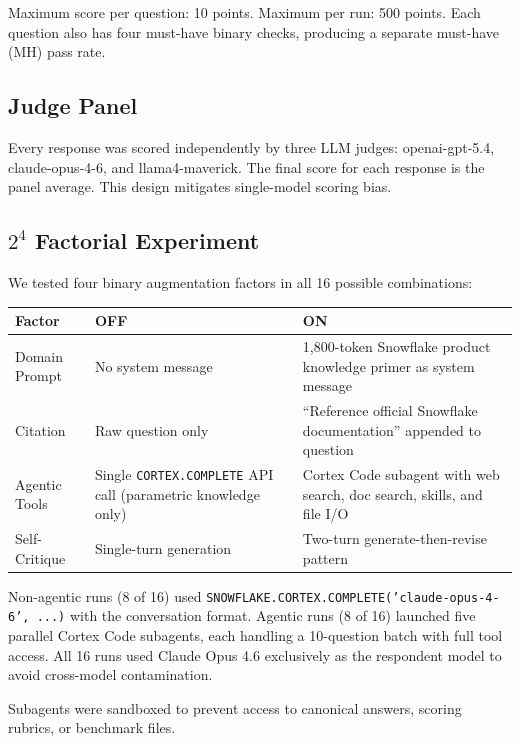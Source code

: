 \documentclass[11pt,letterpaper]{article}
\begin{document}
Maximum score per question: 10 points. Maximum per run: 500 points. Each question also has four must-have binary checks, producing a separate must-have (MH) pass rate.

\subsection{Judge Panel}

Every response was scored independently by three LLM judges: openai-gpt-5.4, claude-opus-4-6, and llama4-maverick. The final score for each response is the panel average. This design mitigates single-model scoring bias.

\subsection{$2^4$ Factorial Experiment}

We tested four binary augmentation factors in all 16 possible combinations:

\begin{table}[H]
\centering
\small
\begin{tabularx}{\textwidth}{lXX}
\toprule
\textbf{Factor} & \textbf{OFF} & \textbf{ON} \\
\midrule
Domain Prompt & No system message & 1,800-token Snowflake product knowledge primer as system message \\
Citation & Raw question only & ``Reference official Snowflake documentation'' appended to question \\
Agentic Tools & Single \texttt{CORTEX.COMPLETE} API call (parametric knowledge only) & Cortex Code subagent with web search, doc search, skills, and file I/O \\
Self-Critique & Single-turn generation & Two-turn generate-then-revise pattern \\
\bottomrule
\end{tabularx}
\end{table}

Non-agentic runs (8 of 16) used \texttt{SNOWFLAKE.CORTEX.COMPLETE('claude-opus-4-6', ...)} with the conversation format. Agentic runs (8 of 16) launched five parallel Cortex Code subagents, each handling a 10-question batch with full tool access. All 16 runs used Claude Opus 4.6 exclusively as the respondent model to avoid cross-model contamination.

Subagents were sandboxed to prevent access to canonical answers, scoring rubrics, or benchmark files.
\end{document}
